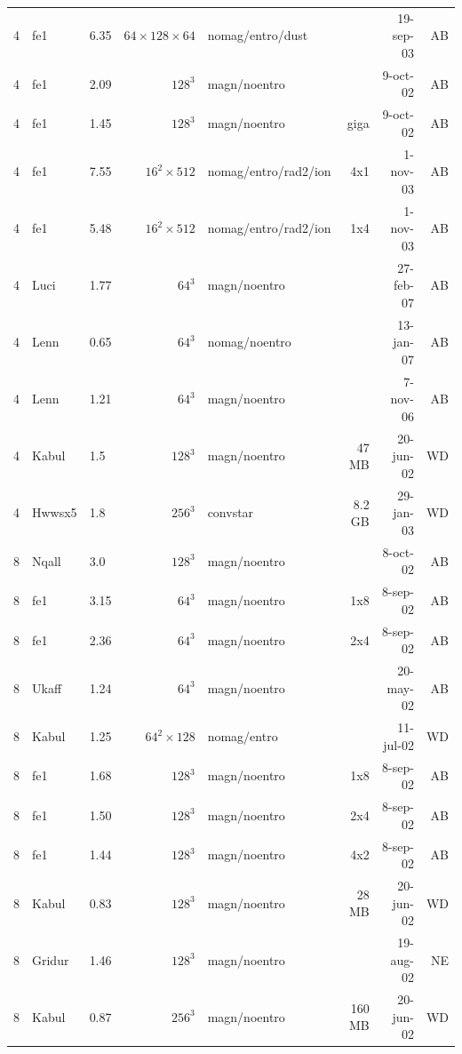 \documentclass[\mydriver,12pt,twoside,notitlepage,a4paper]{article}
\begin{document}
\begin{center}
\begin{small}
\begin{longtable}{rllrlrrr}
   4 & fe1   & 6.35 &  $64\!\times\!128\!\times\!64$
                              & nomag/entro/dust &    & 19-sep-03 & AB \\
   4 & fe1   & 2.09 & $128^3$ & magn/noentro &        &  9-oct-02 & AB \\
   4 & fe1   & 1.45 & $128^3$ & magn/noentro & giga   &  9-oct-02 & AB \\
   4 & fe1   & 7.55 & $16^2{\times}512$                                  
                     & nomag/entro/rad2/ion &  4x1   &  1-nov-03 & AB \\
   4 & fe1   & 5.48 & $16^2{\times}512$                                  
                     & nomag/entro/rad2/ion &  1x4   &  1-nov-03 & AB \\
   4 & Luci  & 1.77 &  $64^3$ & magn/noentro &        & 27-feb-07 & AB \\
   4 & Lenn  & 0.65 &  $64^3$ &nomag/noentro &        & 13-jan-07 & AB \\
   4 & Lenn  & 1.21 &  $64^3$ & magn/noentro &        &  7-nov-06 & AB \\
   4 & Kabul & 1.5  & $128^3$ & magn/noentro &  47 MB & 20-jun-02 & WD \\
   4 & Hwwsx5& 1.8  & $256^3$ & convstar     & 8.2 GB & 29-jan-03 & WD \\
   8 & Nqall & 3.0  & $128^3$ & magn/noentro &        &  8-oct-02 & AB \\
   8 & fe1   & 3.15 &  $64^3$ & magn/noentro &  1x8   &  8-sep-02 & AB \\
   8 & fe1   & 2.36 &  $64^3$ & magn/noentro &  2x4   &  8-sep-02 & AB \\
   8 & Ukaff & 1.24 &  $64^3$ & magn/noentro &        & 20-may-02 & AB \\
   8 & Kabul & 1.25 & $64^2{\times}128$                                  
                              & nomag/entro &        & 11-jul-02 & WD \\
   8 & fe1   & 1.68 & $128^3$ & magn/noentro &  1x8   &  8-sep-02 & AB \\
   8 & fe1   & 1.50 & $128^3$ & magn/noentro &  2x4   &  8-sep-02 & AB \\
   8 & fe1   & 1.44 & $128^3$ & magn/noentro &  4x2   &  8-sep-02 & AB \\
   8 & Kabul & 0.83 & $128^3$ & magn/noentro &  28 MB & 20-jun-02 & WD \\
   8 & Gridur& 1.46 & $128^3$ & magn/noentro &        & 19-aug-02 & NE \\
   8 & Kabul & 0.87 & $256^3$ & magn/noentro & 160 MB & 20-jun-02 & WD \\

\end{longtable}
\end{small}
\end{center}
\end{document}
